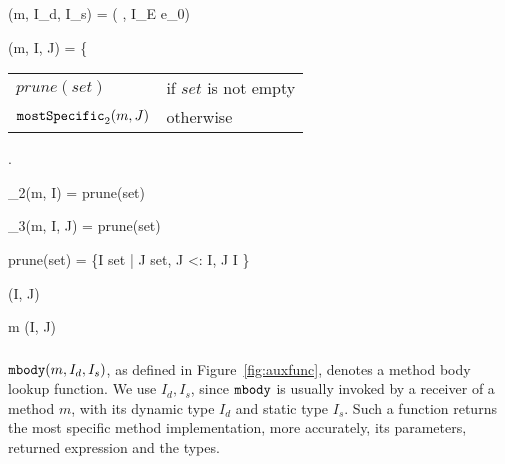 \begin{figure*}[htbp]
	\begin{mathpar}
		{\mbody(m, I_d, I_s) = ( \; , I_E \; e_0)}
	
	{\mostSpecific(m, I, J) = \left\{{\begin{tabular}{ll}
				$prune(set)$ & if $set$ is not empty \\ $\texttt{mostSpecific}_2(m, J)$ & otherwise
			\end{tabular}}\right.}
		{\mostSpecific_2(m, I) = prune(set)}
	
		{\mostSpecific_3(m, I, J) = prune(set)}
	
	prune(set) = \{I \in set \; | \; \nexists J \in set, J <: I, J \neq I \}
	
	{\ext(I, J)}
	
	{m \in \updateSet(I, J)}
	\end{mathpar}
	\caption{Auxiliary functions.}\label{fig:auxfunc}
\end{figure*}


\subsubsection{\mbody}

$\texttt{mbody}(m, I_d, I_s)$, as defined in Figure~\ref{fig:auxfunc}, denotes a method body lookup function.
We use $I_d, I_s$, since $\texttt{mbody}$ is usually invoked by a receiver of a method $m$, with its dynamic
type $I_d$ and static type $I_s$. Such a function returns the most specific method implementation, more
accurately, its parameters, returned expression and the types.

